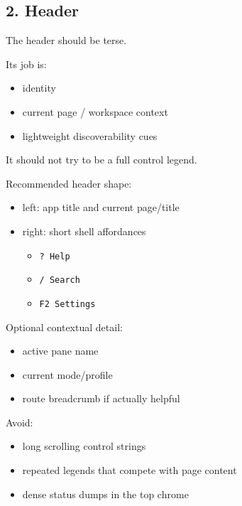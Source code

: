 \subsection{2. Header}\label{record-047-header}

The header should be terse.

Its job is:

\begin{itemize}
\tightlist
\item
  identity
\item
  current page / workspace context
\item
  lightweight discoverability cues
\end{itemize}

It should not try to be a full control legend.

Recommended header shape:

\begin{itemize}
\tightlist
\item
  left: app title and current page/title
\item
  right: short shell affordances

  \begin{itemize}
  \tightlist
  \item
    \texttt{?\allowbreak{} \allowbreak{}H\allowbreak{}e\allowbreak{}l\allowbreak{}p}
  \item
    \texttt{/\allowbreak{} \allowbreak{}S\allowbreak{}e\allowbreak{}a\allowbreak{}r\allowbreak{}c\allowbreak{}h}
  \item
    \texttt{F\allowbreak{}2\allowbreak{} \allowbreak{}S\allowbreak{}e\allowbreak{}t\allowbreak{}t\allowbreak{}i\allowbreak{}n\allowbreak{}g\allowbreak{}s}
  \end{itemize}
\end{itemize}

Optional contextual detail:

\begin{itemize}
\tightlist
\item
  active pane name
\item
  current mode/profile
\item
  route breadcrumb if actually helpful
\end{itemize}

Avoid:

\begin{itemize}
\tightlist
\item
  long scrolling control strings
\item
  repeated legends that compete with page content
\item
  dense status dumps in the top chrome
\end{itemize}

